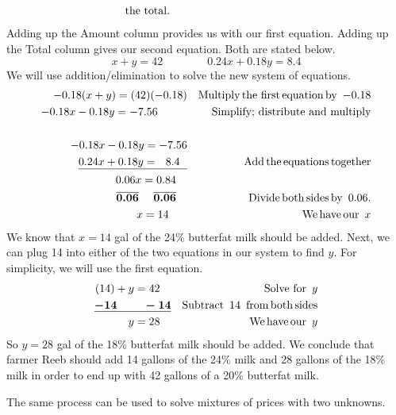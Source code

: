 \begin{example}
\begin{eqnarray*}
\begin{array}{p{0.425\textwidth}}
      \tmop{the~total}.
    \end{array}\\
 \end{eqnarray*}
Adding up the Amount column provides us with our first equation.  Adding up the Total column gives our second equation.  Both are stated below.
$$x + y = 42\qquad\qquad 0.24 x + 0.18 y = 8.4$$
We will use addition/elimination to solve the new system of equations. 
\begin{eqnarray*}
    - 0.18 (x + y) = (42) (- 0.18) &  & \operatorname{Multiply} \operatorname{the~first} \operatorname{equation} \operatorname{by~} - 0.18\\
    - 0.18 x - 0.18 y = - 7.56~~~~~~~~ &  & \text{Simplify;~distribute~and~multiply}\\
    &  & \\
    - 0.18 x - 0.18 y = - 7.56 &  &\\
    \underline{0.24 x + 0.18 y = ~~8.4~~} &  &  \operatorname{Add} \operatorname{the} \operatorname{equations}
    \operatorname{together}\\
    0.06 x = 0.84~~~ &  & \\
    \boldsymbol{\overline{0.06} ~~~~ \overline{0.06}}~~~ &  & \operatorname{Divide} \operatorname{both} \operatorname{sides} \operatorname{by~} 0.06.\\
     x = 14~~~~~ &  & \operatorname{We} \operatorname{have} \operatorname{our~} x
	\end{eqnarray*}
	We know that $x=14$ gal of the 24\% butterfat milk should be added.  Next, we can plug 14 into either of the two equations in our system to find $y$.  For simplicity, we will use the first equation.
	\begin{eqnarray*}
		(14) + y = 42~~~ &  &\operatorname{Solve~for~} y\\
    \boldsymbol{\underline{- 14 ~~~~~~~- 14}} &  & \operatorname{Subtract~} 14 \operatorname{~from} \operatorname{both}
    \operatorname{sides}\\
    y = 28~~~ &  & \operatorname{We} \operatorname{have} \operatorname{our~} y
	\end{eqnarray*}
	So $y=28$ gal of the 18\% butterfat milk should be added.  We conclude that farmer Reeb should add 14 gallons of the 24\% milk and 28 gallons of the 18\% milk in order to end up with 42 gallons of a 20\% butterfat milk.
\end{example}
  
The same process can be used to solve mixtures of prices with two unknowns.

